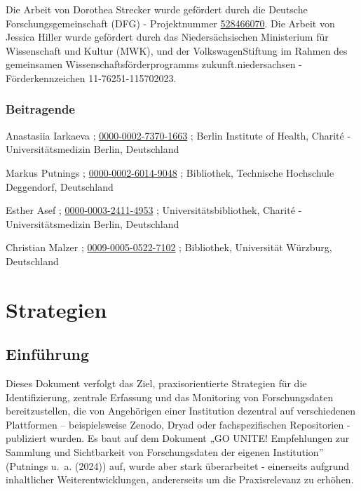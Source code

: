 \documentclass[
  ngerman,
  letterpaper,
  DIV=11]{scrreprt}
\begin{document}

Die Arbeit von Dorothea Strecker wurde gefördert durch die Deutsche
Forschungsgemeinschaft (DFG) - Projektnummer
\href{https://gepris.dfg.de/project/528466070}{528466070}. Die Arbeit
von Jessica Hiller wurde gefördert durch das Niedersächsischen
Ministerium für Wissenschaft und Kultur (MWK), und der
VolkswagenStiftung im Rahmen des gemeinsamen
Wissenschaftsförderprogramms zukunft.niedersachsen - Förderkennzeichen
11-76251-115702023.

\section*{Beitragende}\label{beitragende}


Anastasiia Iarkaeva ;
\href{https://orcid.org/0000-0002-7370-1663}{0000-0002-7370-1663} ;
Berlin Institute of Health, Charité - Universitätsmedizin Berlin,
Deutschland

Markus Putnings ;
\href{https://orcid.org/0000-0002-6014-9048}{0000-0002-6014-9048} ;
Bibliothek, Technische Hochschule Deggendorf, Deutschland

Esther Asef ;
\href{https://orcid.org/0000-0003-2411-4953}{0000-0003-2411-4953} ;
Universitätsbibliothek, Charité - Universitätsmedizin Berlin,
Deutschland

Christian Malzer ;
\href{https://orcid.org/0009-0005-0522-7102}{0009-0005-0522-7102} ;
Bibliothek, Universität Würzburg, Deutschland

\part{Strategien}

\chapter{Einführung}\label{einfuxfchrung}

Dieses Dokument verfolgt das Ziel, praxisorientierte Strategien für die
Identifizierung, zentrale Erfassung und das Monitoring von
Forschungsdaten bereitzustellen, die von Angehörigen einer Institution
dezentral auf verschiedenen Plattformen -- beispielsweise Zenodo, Dryad
oder fachspezifischen Repositorien - publiziert wurden. Es baut auf dem
Dokument „GO UNITE! Empfehlungen zur Sammlung und Sichtbarkeit von
Forschungsdaten der eigenen Institution'' (Putnings u.~a. (2024)) auf,
wurde aber stark überarbeitet - einerseits aufgrund inhaltlicher
Weiterentwicklungen, andererseits um die Praxisrelevanz zu erhöhen.
\end{document}
